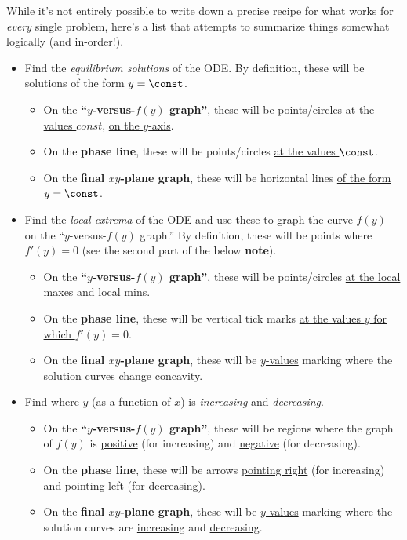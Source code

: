 \documentclass[12pt]{article}
\theoremstyle{definition}
\theoremstyle{underl}
\begin{document}
	While it's not entirely possible to write down a precise recipe for what works for \textit{every} single problem, here's a list that attempts to summarize things somewhat logically (and in-order!).
	\begin{itemize}
		\item Find the \textit{equilibrium solutions} of the ODE. By definition, these will be solutions of the form $y=\const$.
			\begin{itemize}
				\item On the \textbf{``$y$-versus-$f(y)$ graph''}, these will be points/circles \ul{at the values $const$}, \ul{on the $y$-axis}.
				\item On the \textbf{phase line}, these will be points/circles \ul{at the values $\const$}.
				\item On the \textbf{final $xy$-plane graph}, these will be horizontal lines \ul{of the form $y=\const$}.
			\end{itemize}
		\item Find the \textit{local extrema} of the ODE and use these to graph the curve $f(y)$ on the ``$y$-versus-$f(y)$ graph.'' By definition, these will be points where $f'(y)=0$ (see the second part of the below  \textbf{note}).
		\begin{itemize}
			\item On the \textbf{``$y$-versus-$f(y)$ graph''}, these will be points/circles \ul{at the local maxes and local mins}.
			\item On the \textbf{phase line}, these will be vertical tick marks \ul{at the values $y$ for which $f'(y)=0$}.
			\item On the \textbf{final $xy$-plane graph}, these will be \ul{$y$-values} marking where the solution curves \ul{change concavity}.
		\end{itemize}
		\item Find where $y$ (as a function of $x$) is \textit{increasing} and \textit{decreasing}.
			\begin{itemize}
				\item On the \textbf{``$y$-versus-$f(y)$ graph''}, these will be regions where the graph of $f(y)$ is \ul{positive} (for increasing) and \ul{negative} (for decreasing).
				\item On the \textbf{phase line}, these will be arrows \ul{pointing right} (for increasing) and \ul{pointing left} (for decreasing).
				\item On the \textbf{final $xy$-plane graph}, these will be \ul{$y$-values} marking where the solution curves are \ul{increasing} and \ul{decreasing}.

\end{itemize}
\end{itemize}
\end{document}
